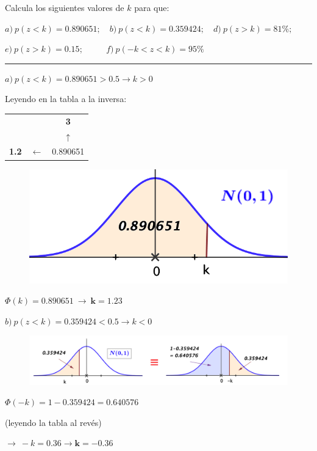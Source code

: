 \vspace{10mm} %
\begin{ejemplo}
\begin{ejre}
Calcula los siguientes valores de $k$ para que:

$a)\ p(z<k)=0.890651;\quad b)\  p(z<k)=0.359424; \quad d)\ p(z>k)=81\%;$

$e)\ p(z>k)=0.15; \ \ \ \qquad f)\ p(-k<z<k)=95\% $

\rule{250pt}{0.1pt}


\begin{multicols}{2}
$a) \ p(z<k)=0.890651>0.5 \to k>0$

Leyendo en la tabla a la inversa: 

\begin{table}[H]
\centering
\begin{tabular}{ccc}
 &  & \textbf{3} \\ \cline{3-3} 
 &  & $\uparrow$ \\
\multicolumn{1}{c|}{\textbf{1.2}} & $\leftarrow $ & 0.890651
\end{tabular}
\end{table}
	
	\begin{figure}[H]
	\centering
	\includegraphics[width=.3\textwidth]{imagenes/imagenes04/T04IM25.png}
	\end{figure}

$\Phi(k)=0.890651 \ \to \ \boldsymbol{ k=1.23 }$
\end{multicols}


\vspace{5mm}
$b)\ p(z<k)=0.359424<0.5 \to k<0$

	\begin{figure}[H]
	\centering
	\includegraphics[width=.95\textwidth]{imagenes/imagenes04/T04IM26.png}
	\end{figure}

$\Phi(-k)=1-0.359424=0.640576 \ $ 
\begin{small} \textcolor{gris}{(leyendo la tabla al revés)} \end{small} 
$\to \ -k=0.36 \to \boldsymbol{k=-0.36}$



\end{ejre}
\end{ejemplo}
